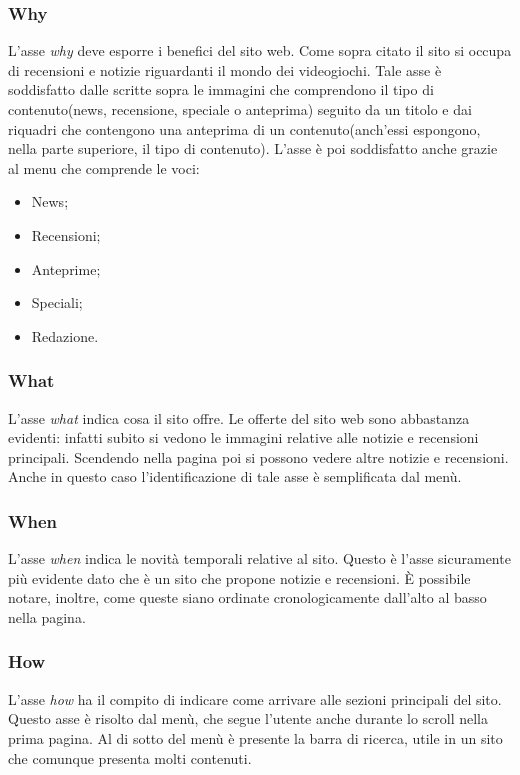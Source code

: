 \documentclass[../ProgettoTecWeb2.tex]{subfiles}
\begin{document}
		\subsubsection{Why}
			L'asse \textit{why} deve esporre i benefici del sito web. Come sopra citato il sito si occupa di recensioni e notizie riguardanti il mondo dei videogiochi. Tale asse è soddisfatto dalle scritte sopra le immagini che comprendono il tipo di contenuto(news, recensione, speciale o anteprima) seguito da un titolo e dai riquadri che contengono una anteprima di un contenuto(anch'essi espongono, nella parte superiore, il tipo di contenuto). L'asse è poi soddisfatto anche grazie al menu che comprende le voci:
			\begin{itemize}
				\item News;
				\item Recensioni;
				\item Anteprime;
				\item Speciali;
				\item Redazione.
			\end{itemize}
		\subsubsection{What}
			L'asse \textit{what} indica cosa il sito offre. Le offerte del sito web sono abbastanza evidenti: infatti subito si vedono le immagini relative alle notizie e recensioni principali. Scendendo nella pagina poi si possono vedere altre notizie e recensioni. Anche in questo caso l'identificazione di tale asse è semplificata dal menù.
		\subsubsection{When}
			L'asse \textit{when} indica le novità temporali relative al sito. Questo è l'asse sicuramente più evidente dato che è un sito che propone notizie e recensioni. È possibile notare, inoltre, come queste siano ordinate cronologicamente dall'alto al basso nella pagina.
		\subsubsection{How}
			L'asse \textit{how} ha il compito di indicare come arrivare alle sezioni principali del sito. Questo asse è risolto dal menù, che segue l'utente anche durante lo scroll nella prima pagina. Al di sotto del menù è presente la barra di ricerca, utile in un sito che comunque presenta molti contenuti.
			
\end{document}
